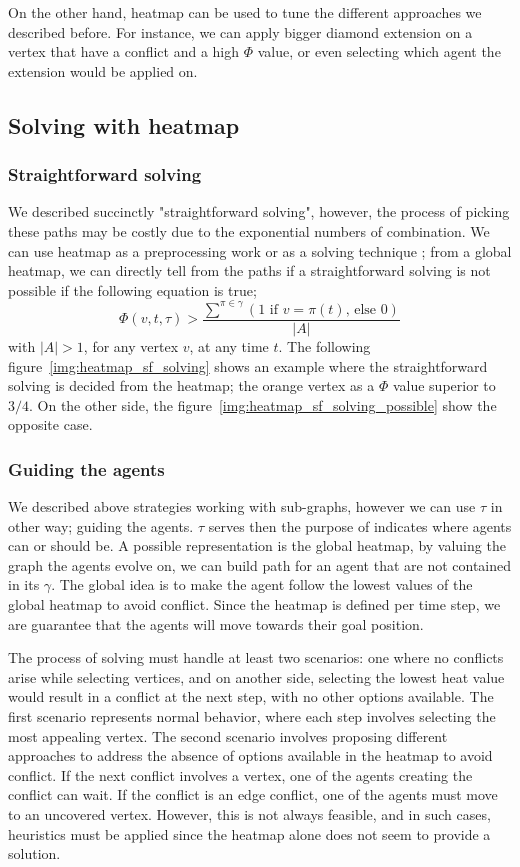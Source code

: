 On the other hand, heatmap can be used to tune the different approaches we described before. For instance, we can apply bigger diamond extension on a vertex that have a conflict and a high \(\Phi\) value, or even selecting which agent the extension would be applied on. 

\subsection{Solving with heatmap}

\subsubsection{Straightforward solving}
We described succinctly "straightforward solving", however, the process of picking these paths may be costly due to the exponential numbers of combination. We can use heatmap as a preprocessing work or as a solving technique ; from a global heatmap, we can directly tell from the paths if a straightforward solving is not possible if the following equation is true; 
\[ 
  \Phi(v,t,\tau) > \frac{ \sum^{\pi \in \gamma}{(1 \text{ if } v = \pi(t) \text{, else } 0)}}{|A|}
\] 
with \(|A| > 1\), for any vertex \(v\), at any time \(t\). The following figure~\ref{img:heatmap_sf_solving} shows an example where the straightforward solving is decided from the heatmap; the orange vertex as a \(\Phi\) value superior to \(3/4\). On the other side, the figure~\ref{img:heatmap_sf_solving_possible} show the opposite case.

\subsubsection{Guiding the agents}

We described above strategies working with sub-graphs, however we can use \(\tau\) in other way; guiding the agents. \(\tau\) serves then the purpose of indicates where agents can or should be. A possible representation is the global heatmap, by valuing the graph the agents evolve on, we can build path for an agent that are not contained in its \(\gamma\). The global idea is to make the agent follow the lowest values of the global heatmap to avoid conflict. Since the heatmap is defined per time step, we are guarantee that the agents will move towards their goal position.

The process of solving must handle at least two scenarios: one where no conflicts arise while selecting vertices, and on another side, selecting the lowest heat value would result in a conflict at the next step, with no other options available. The first scenario represents normal behavior, where each step involves selecting the most appealing vertex. The second scenario involves proposing different approaches to address the absence of options available in the heatmap to avoid conflict. If the next conflict involves a vertex, one of the agents creating the conflict can wait. If the conflict is an edge conflict, one of the agents must move to an uncovered vertex. However, this is not always feasible, and in such cases, heuristics must be applied since the heatmap alone does not seem to provide a solution.

